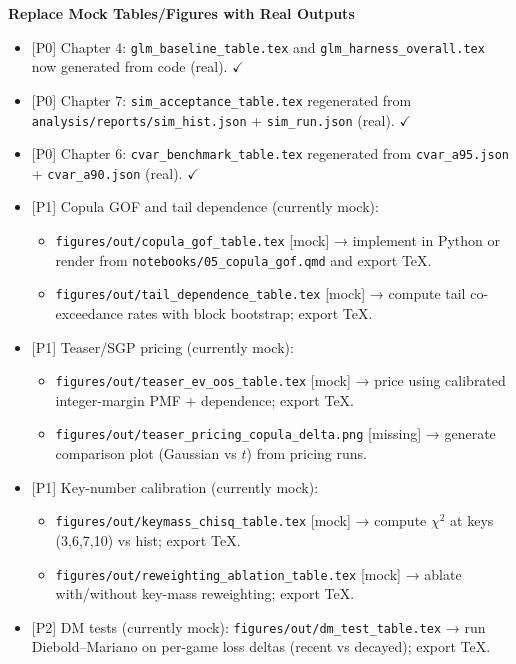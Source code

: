 \documentclass[11pt]{article}
\newcommand{\block}[1]{\par\noindent\textbf{#1}\par\vspace{0.25em}}
\newcommand{\done}{\textcolor{green!60!black}{\(\checkmark\)}}
\newcommand{\prio}[1]{\textcolor{blue!70!black}{[#1]}}
\begin{document}
\begin{itemize}
\block{Replace Mock Tables/Figures with Real Outputs}
\begin{itemize}
  \item \prio{P0} Chapter 4: \texttt{glm\_baseline\_table.tex} and \texttt{glm\_harness\_overall.tex} now generated from code (real). \done
  \item \prio{P0} Chapter 7: \texttt{sim\_acceptance\_table.tex} regenerated from \texttt{analysis/reports/sim\_hist.json} + \texttt{sim\_run.json} (real). \done
  \item \prio{P0} Chapter 6: \texttt{cvar\_benchmark\_table.tex} regenerated from \texttt{cvar\_a95.json} + \texttt{cvar\_a90.json} (real). \done
  \item \prio{P1} Copula GOF and tail dependence (currently mock):
    \begin{itemize}
      \item \texttt{figures/out/copula\_gof\_table.tex} [mock] → implement in Python or render from \texttt{notebooks/05\_copula\_gof.qmd} and export TeX.
      \item \texttt{figures/out/tail\_dependence\_table.tex} [mock] → compute tail co-exceedance rates with block bootstrap; export TeX.
    \end{itemize}
  \item \prio{P1} Teaser/SGP pricing (currently mock):
    \begin{itemize}
      \item \texttt{figures/out/teaser\_ev\_oos\_table.tex} [mock] → price using calibrated integer-margin PMF + dependence; export TeX.
      \item \texttt{figures/out/teaser\_pricing\_copula\_delta.png} [missing] → generate comparison plot (Gaussian vs $t$) from pricing runs.
    \end{itemize}
  \item \prio{P1} Key-number calibration (currently mock):
    \begin{itemize}
      \item \texttt{figures/out/keymass\_chisq\_table.tex} [mock] → compute $\chi^2$ at keys (3,6,7,10) vs hist; export TeX.
      \item \texttt{figures/out/reweighting\_ablation\_table.tex} [mock] → ablate with/without key-mass reweighting; export TeX.
    \end{itemize}
  \item \prio{P2} DM tests (currently mock): \texttt{figures/out/dm\_test\_table.tex} → run Diebold–Mariano on per-game loss deltas (recent vs decayed); export TeX.

\end{itemize}
\end{itemize}
\end{document}
